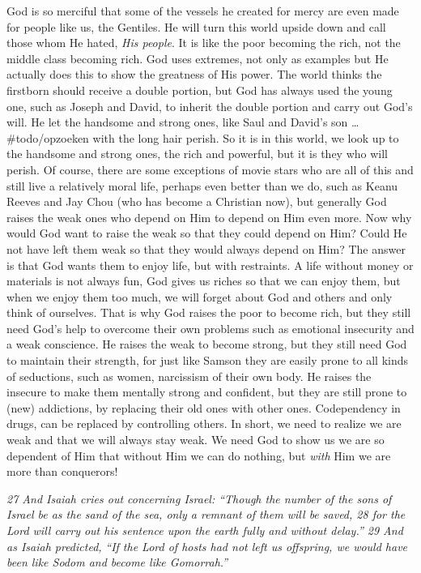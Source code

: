 God is so merciful that some of the vessels he created for mercy are
even made for people like us, the Gentiles. He will turn this world
upside down and call those whom He hated, \emph{His people}. It is like
the poor becoming the rich, not the middle class becoming rich. God uses
extremes, not only as examples but He actually does this to show the
greatness of His power. The world thinks the firstborn should receive a
double portion, but God has always used the young one, such as Joseph
and David, to inherit the double portion and carry out God's will. He
let the handsome and strong ones, like Saul and David's son \ldots{}
\#todo/opzoeken with the long hair perish. So it is in this world, we
look up to the handsome and strong ones, the rich and powerful, but it
is they who will perish. Of course, there are some exceptions of movie
stars who are all of this and still live a relatively moral life,
perhaps even better than we do, such as Keanu Reeves and Jay Chou (who
has become a Christian now), but generally God raises the weak ones who
depend on Him to depend on Him even more. Now why would God want to
raise the weak so that they could depend on Him? Could He not have left
them weak so that they would always depend on Him? The answer is that
God wants them to enjoy life, but with restraints. A life without money
or materials is not always fun, God gives us riches so that we can enjoy
them, but when we enjoy them too much, we will forget about God and
others and only think of ourselves. That is why God raises the poor to
become rich, but they still need God's help to overcome their own
problems such as emotional insecurity and a weak conscience. He raises
the weak to become strong, but they still need God to maintain their
strength, for just like Samson they are easily prone to all kinds of
seductions, such as women, narcissism of their own body. He raises the
insecure to make them mentally strong and confident, but they are still
prone to (new) addictions, by replacing their old ones with other ones.
Codependency in drugs, can be replaced by controlling others. In short,
we need to realize we are weak and that we will always stay weak. We
need God to show us we are so dependent of Him that without Him we can
do nothing, but \emph{with} Him we are more than conquerors!

\emph{27 And Isaiah cries out concerning Israel: ``Though the number of
the sons of Israel be as the sand of the sea, only a remnant of them
will be saved, 28 for the Lord will carry out his sentence upon the
earth fully and without delay.'' 29 And as Isaiah predicted,} \emph{``If
the Lord of hosts had not left us offspring, we would have been
like Sodom and become like Gomorrah.''}


